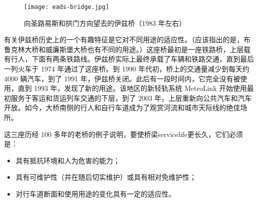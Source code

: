 \begin{figure}
  \texttt{[image: eads-bridge.jpg]}
  \caption{向圣路易斯和拱门方向望去的伊兹桥（1983 年左右）}
  \label{fig:eads-bridge}
\end{figure}

有关伊兹桥历史上的一个有趣特征是它对不同用途的适应性。（应该指出的是，布鲁克林大桥和威廉斯堡大桥也有不同的用途。）这座桥最初是一座铁路桥，上层载有行人，下面有两条铁路线。伊兹桥实际上最终承载了车辆和铁路交通，直到最后一列火车于 1974 年通过了这座桥。到 1990 年代初，桥上的交通量减少到每天约 \num{4000} 辆汽车，到了 1991 年，伊兹桥关闭。此后有一段时间内，它完全没有被使用，直到 1993 年，发现了新的用途。该地区的新轻轨系统 MetroLink 开始使用最初服务于客运和货运列车交通的下层，到了 2003 年，上层重新向公共汽车和汽车开放。如今，大桥南侧的行人和自行车道成为了观赏河流和城市天际线的绝佳场所。

这三座历经 100 多年的老桥的例子说明，要使桥梁\gls*{servicelife}更长久，它们必须是：
\begin{itemize}
  \item 具有抵抗环境和人为危害的能力；
  \item 具有可维护性（并在随后切实维护）或具有相对免维护性；
  \item 对行车道断面和使用用途的变化具有一定的适应性。
\end{itemize}

